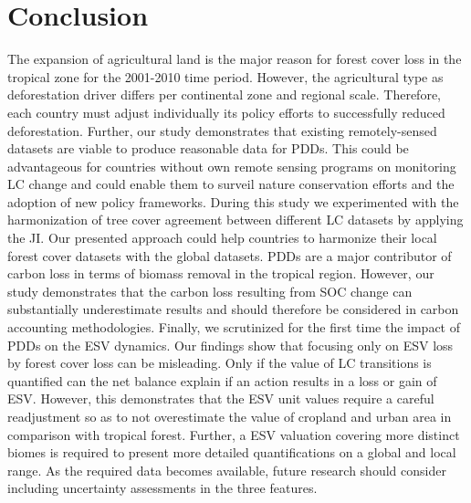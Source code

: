 \chapter{Conclusion}
\label{ch:conclusion}
	The expansion of agricultural land is the major reason for forest cover loss in the tropical zone for the 2001-2010 time period. However, the agricultural type as deforestation driver differs per continental zone and regional scale. Therefore, each country must adjust individually its policy efforts to successfully reduced deforestation. Further, our study demonstrates that existing remotely-sensed datasets are viable to produce reasonable data for \acp{PDD}. This could be advantageous for countries without own remote sensing programs on monitoring \ac{LC} change and could enable them to surveil nature conservation efforts and the adoption of new policy frameworks. During this study we experimented with the harmonization of tree cover agreement between different \ac{LC} datasets by applying the \ac{JI}. Our presented approach could help countries to harmonize their local forest cover datasets with the global datasets. \acp{PDD} are a major contributor of carbon loss in terms of biomass removal in the tropical region. However, our study demonstrates that the carbon loss resulting from \ac{SOC} change can substantially underestimate results and should therefore be considered in carbon accounting methodologies. Finally, we scrutinized for the first time the impact of \acp{PDD} on the \ac{ESV} dynamics. Our findings show that focusing only on \ac{ESV} loss by forest cover loss can be misleading. Only if the value of \ac{LC} transitions is quantified can the net balance explain if an action results in a loss or gain of \ac{ESV}. However, this demonstrates that the \ac{ESV} unit values require a careful readjustment so as to not overestimate the value of cropland and urban area in comparison with tropical forest. Further, a \ac{ESV} valuation covering more distinct biomes is required to present more detailed quantifications on a global and local range. As the required data becomes available, future research should consider including uncertainty assessments in the three features.